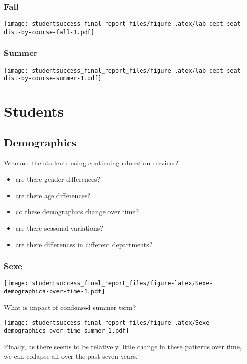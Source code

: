 \documentclass[]{book}
\providecommand{\tightlist}{%
  \setlength{\itemsep}{0pt}\setlength{\parskip}{0pt}}
\theoremstyle{definition}
\theoremstyle{definition}
\theoremstyle{remark}
\begin{document}
\subsubsection{Fall}\label{fall}

\texttt{[image: studentsuccess\_final\_report\_files/figure-latex/lab-dept-seat-dist-by-course-fall-1.pdf]}

\subsubsection{Summer}\label{summer}

\texttt{[image: studentsuccess\_final\_report\_files/figure-latex/lab-dept-seat-dist-by-course-summer-1.pdf]}

\section{Students}\label{students}

\subsection{Demographics}\label{demographics}

Who are the students using continuing education services?

\begin{itemize}
\tightlist
\item
  are there gender differences?
\item
  are there age differences?
\item
  do these demographics change over time?
\item
  are there seasonal variations?
\item
  are there differences in different departments?
\end{itemize}

\subsubsection{Sexe}\label{sexe}

\texttt{[image: studentsuccess\_final\_report\_files/figure-latex/Sexe-demographics-over-time-1.pdf]}

What is impact of condensed summer term?

\texttt{[image: studentsuccess\_final\_report\_files/figure-latex/Sexe-demographics-over-time-summer-1.pdf]}

Finally, as there seems to be relatively little change in these patterns
over time, we can collapse all over the past seven years,
\end{document}

